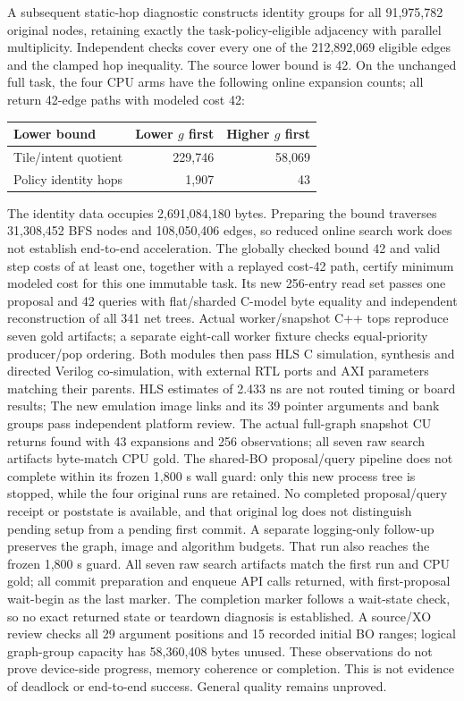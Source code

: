 \documentclass[10pt]{article}
\begin{document}
A subsequent static-hop diagnostic constructs identity groups for all
91,975,782 original nodes, retaining exactly the task-policy-eligible
adjacency with parallel multiplicity. Independent checks cover every one
of the 212,892,069 eligible edges and the clamped hop inequality. The
source lower bound is 42. On the unchanged full task, the four CPU arms
have the following online expansion counts; all return 42-edge paths
with modeled cost 42:
\begin{center}
\begin{tabular}{lrr}
\toprule
Lower bound & Lower $g$ first & Higher $g$ first \\
\midrule
Tile/intent quotient & 229,746 & 58,069 \\
Policy identity hops & 1,907 & 43 \\
\bottomrule
\end{tabular}
\end{center}
The identity data occupies 2,691,084,180 bytes. Preparing the bound traverses
31,308,452 BFS nodes and 108,050,406 edges, so reduced online search work
does not establish end-to-end acceleration. The globally checked bound
42 and valid step costs of at least one, together with a replayed cost-42
path, certify minimum modeled cost for this one immutable task. Its new
256-entry read set passes one proposal and 42 queries with flat/sharded
C-model byte equality and independent reconstruction of all 341 net trees.
Actual worker/snapshot C++ tops reproduce seven gold artifacts; a separate
eight-call worker fixture checks equal-priority producer/pop ordering.
Both modules then pass HLS C simulation, synthesis and directed Verilog
co-simulation, with external RTL ports and AXI parameters matching their
parents. HLS estimates of 2.433 ns are not routed timing or board results;
The new emulation image links and its 39 pointer arguments and bank groups
pass independent platform review. The actual full-graph snapshot CU
returns found with 43 expansions and 256 observations; all seven raw
search artifacts byte-match CPU gold. The shared-BO proposal/query pipeline does not complete within its
frozen 1,800 s wall guard: only this new process tree is stopped, while
the four original runs are retained. No completed proposal/query receipt
or poststate is available, and that original log does not distinguish
pending setup from a pending first commit. A separate logging-only
follow-up preserves the graph, image and algorithm budgets. That run also reaches the frozen 1,800 s guard. All seven raw search
artifacts match the first run and CPU gold; all commit preparation and
enqueue API calls returned, with first-proposal wait-begin as the last
marker. The completion marker follows a wait-state check, so no exact
returned state or teardown diagnosis is established. A source/XO review checks
all 29 argument positions and 15 recorded initial BO ranges; logical
graph-group capacity has 58,360,408 bytes unused. These observations
do not prove device-side progress, memory coherence or completion. This is not evidence of deadlock or
end-to-end success. General quality remains unproved.
\end{document}
